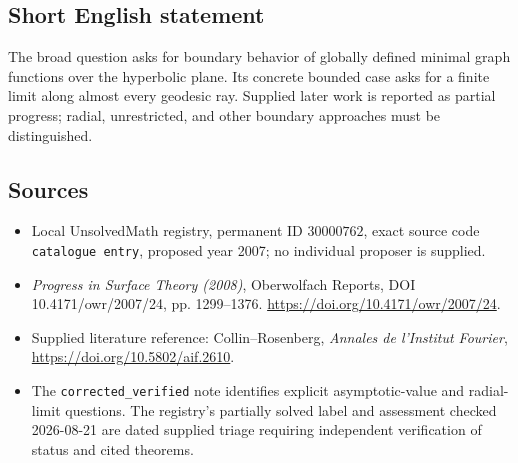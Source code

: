 \documentclass[11pt]{article}
\begin{document}
\subsection{Short English statement}
The broad question asks for boundary behavior of globally defined minimal graph functions over the hyperbolic plane. Its concrete bounded case asks for a finite limit along almost every geodesic ray. Supplied later work is reported as partial progress; radial, unrestricted, and other boundary approaches must be distinguished.
\subsection{Sources}
\begin{itemize}
\item Local UnsolvedMath registry, permanent ID \(30000762\), exact source code \texttt{catalogue entry}, proposed year 2007; no individual proposer is supplied.
\item \emph{Progress in Surface Theory (2008)}, Oberwolfach Reports, DOI 10.4171/owr/2007/24, pp. 1299--1376. \url{https://doi.org/10.4171/owr/2007/24}.
\item Supplied literature reference: Collin--Rosenberg, \emph{Annales de l'Institut Fourier}, \url{https://doi.org/10.5802/aif.2610}.
\item The \texttt{corrected\_verified} note identifies explicit asymptotic-value and radial-limit questions. The registry's partially solved label and assessment checked 2026-08-21 are dated supplied triage requiring independent verification of status and cited theorems.
\end{itemize}
\end{document}
